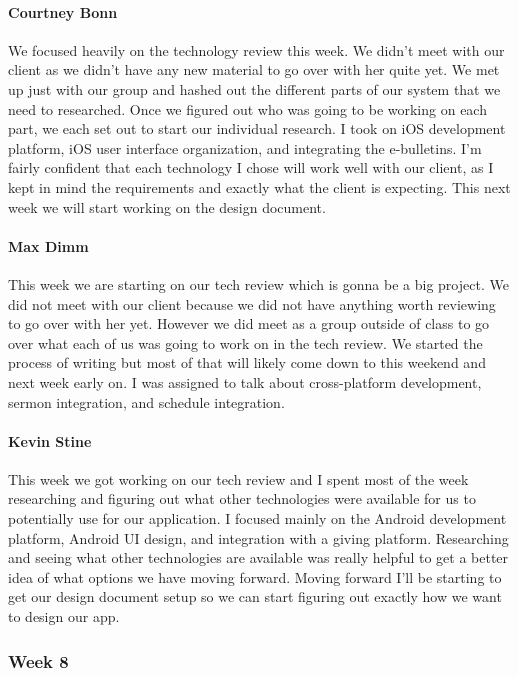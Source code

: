 			\paragraph{Courtney Bonn}
			We focused heavily on the technology review this week. We didn't meet with our client as we didn't have any new material to go over with her quite yet. We met up just with our group and hashed out the different parts of our system that we need to researched. Once we figured out who was going to be working on each part, we each set out to start our individual research. I took on iOS development platform, iOS user interface organization, and integrating the e-bulletins. I'm fairly confident that each technology I chose will work well with our client, as I kept in mind the requirements and exactly what the client is expecting. This next week we will start working on the design document.

			\paragraph{Max Dimm}
			This week we are starting on our tech review which is gonna be a big project. We did not meet with our client because we did not have anything worth reviewing to go over with her yet. However we did meet as a group outside of class to go over what each of us was going to work on in the tech review. We started the process of writing but most of that will likely come down to this weekend and next week early on. I was assigned to talk about cross-platform development, sermon integration, and schedule integration.

			\paragraph{Kevin Stine}
			This week we got working on our tech review and I spent most of the week researching and figuring out what other technologies were available for us to potentially use for our application. I focused mainly on the Android development platform, Android UI design, and integration with a giving platform. Researching and seeing what other technologies are available was really helpful to get a better idea of what options we have moving forward. Moving forward I'll be starting to get our design document setup so we can start figuring out exactly how we want to design our app.

		\subsubsection{Week 8}

